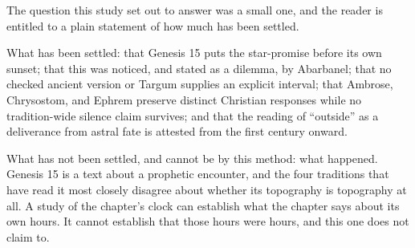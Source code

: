The question this study set out to answer was a small one, and the reader is
entitled to a plain statement of how much has been settled.

What has been settled: that Genesis 15 puts the star-promise before its own
sunset; that this was noticed, and stated as a dilemma, by Abarbanel; that no
checked ancient version or Targum supplies an explicit interval; that Ambrose,
Chrysostom, and Ephrem preserve distinct Christian responses while no
tradition-wide silence claim survives; and that the reading of
``outside'' as a deliverance from astral fate is attested from the first century
onward.

What has not been settled, and cannot be by this method: what happened. Genesis
15 is a text about a prophetic encounter, and the four traditions that have read
it most closely disagree about whether its topography is topography at all. A
study of the chapter's clock can establish what the chapter says about its own
hours. It cannot establish that those hours were hours, and this one does not
claim to.
